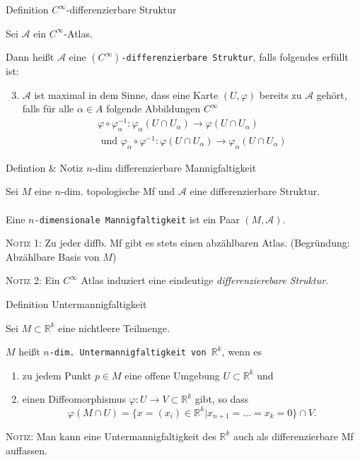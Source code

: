 \documentclass[a6paper,11pt,grid=front]{kartei}
\newcommand{\fl}[1]{\begin{flushleft}
 #1 \end{flushleft}}
\newcommand{\R}{\mathbb{R}}
\begin{document}
\nonameyet
{Definition} {$C^\infty$-differenzierbare Struktur}
{Sei $\mathcal{A}$ ein $C^\infty$-Atlas. 
%
\\ 
\fl{
Dann heißt $\mathcal{A}$ eine \texttt{$(C^\infty)$-differenzierbare Struktur},
falls folgendes erfüllt ist:
}
%
\begin{enumerate}[1.]
\setcounter{enumi}{2}
%
\item $\mathcal{A}$ ist maximal in dem Sinne, dass eine Karte $(U,\varphi)$ 
bereits zu $\mathcal{A}$ gehört, falls für alle $\alpha \in A$ folgende 
Abbildungen $C^\infty$
%
\vspace{-0.5em}
\[
\begin{aligned}
\varphi \circ \varphi_\alpha^{-1}: \varphi_\alpha(U \cap U_\alpha) \to 
\varphi (U \cap U_\alpha)
\\ \text{ und }
\varphi_\alpha \circ \varphi^{-1}: \varphi(U \cap U_\alpha) \to
\varphi_\alpha (U \cap U_\alpha)
\end{aligned}
\]
%
\end{enumerate}
}
{}

\nonameyet
{\tiny Defintion \& Notiz} {\scriptsize $n$-dim differenzierbare Mannigfaltigkeit}
{
\small
Sei $M$ eine $n$-dim. topologische Mf und $\mathcal{A}$ eine differenzierbare 
Struktur.
\\
~\\
Eine \texttt{$n$-dimensionale Mannigfaltigkeit} ist ein Paar $(M,\mathcal{A})$.

\fl{\textsc{Notiz 1:} Zu jeder diffb. Mf gibt es stets einen abzählbaren Atlas. 
(Begründung: Abzählbare Basis von $M$)}

\fl{\textsc{Notiz 2:} Ein $C^\infty$ Atlas induziert eine eindeutige 
\textit{differenzierebare Struktur}.}
}
{}
\nonameyet
{Definition} {Untermannigfaltigkeit}
{
\small 
Sei $M \subset \R^k$ eine nichtleere Teilmenge.
\\
\fl{$M$ heißt \texttt{$n$-dim. Untermannigfaltigkeit von $\R^k$}, wenn es
}
\begin{enumerate}[1.]
\item zu jedem Punkt $p\in M$ eine offene Umgebung $U \subset \R^k$  und
\item einen Diffeomorphismus $\varphi : U \to V \subset \R^k$ gibt, so dass
\[
\varphi(M \cap U) = \{ x = (x_i) \in \R^k | x_{n+1} = \dots = x_k = 0
\} \cap V.
\]
\end{enumerate}
%

\fl{\textsc{Notiz:} Man kann eine Untermannigfaltigkeit des $\R^k$ auch als differenzierbare Mf
		auffassen. }
}
{}
\end{document}
